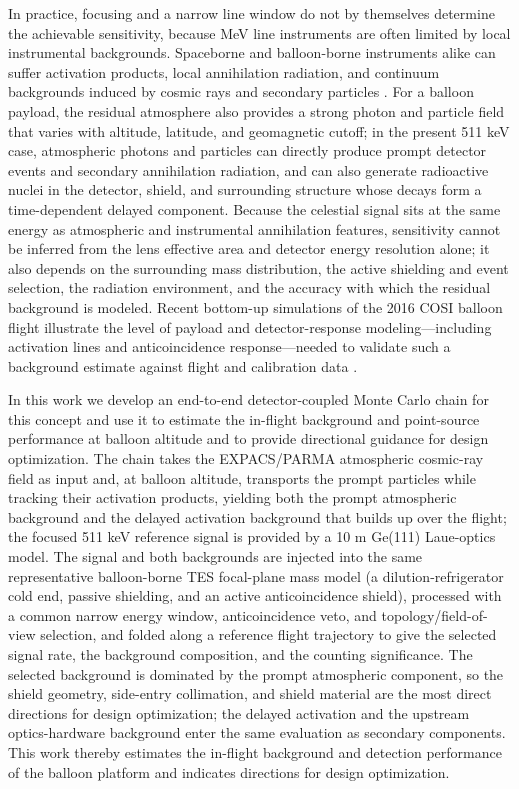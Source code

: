 \documentclass[pdflatex,sn-mathphys-num]{sn-jnl}
\begin{document}
In practice, focusing and a narrow line window do not by themselves determine the achievable sensitivity, because MeV line instruments are often limited by local instrumental backgrounds. Spaceborne and balloon-borne instruments alike can suffer activation products, local annihilation radiation, and continuum backgrounds induced by cosmic rays and secondary particles \cite{Sturner2003,Gehrels1985}. For a balloon payload, the residual atmosphere also provides a strong photon and particle field that varies with altitude, latitude, and geomagnetic cutoff; in the present 511 keV case, atmospheric photons and particles can directly produce prompt detector events and secondary annihilation radiation, and can also generate radioactive nuclei in the detector, shield, and surrounding structure whose decays form a time-dependent delayed component. Because the celestial signal sits at the same energy as atmospheric and instrumental annihilation features, sensitivity cannot be inferred from the lens effective area and detector energy resolution alone; it also depends on the surrounding mass distribution, the active shielding and event selection, the radiation environment, and the accuracy with which the residual background is modeled. Recent bottom-up simulations of the 2016 COSI balloon flight illustrate the level of payload and detector-response modeling---including activation lines and anticoincidence response---needed to validate such a background estimate against flight and calibration data \cite{Gallego2025Balloon,Beechert2022,Ciabattoni2025ACS}.

In this work we develop an end-to-end detector-coupled Monte Carlo chain for this concept and use it to estimate the in-flight background and point-source performance at balloon altitude and to provide directional guidance for design optimization. The chain takes the EXPACS/PARMA atmospheric cosmic-ray field as input and, at balloon altitude, transports the prompt particles while tracking their activation products, yielding both the prompt atmospheric background and the delayed activation background that builds up over the flight; the focused 511 keV reference signal is provided by a 10 m Ge(111) Laue-optics model. The signal and both backgrounds are injected into the same representative balloon-borne TES focal-plane mass model (a dilution-refrigerator cold end, passive shielding, and an active anticoincidence shield), processed with a common narrow energy window, anticoincidence veto, and topology/field-of-view selection, and folded along a reference flight trajectory to give the selected signal rate, the background composition, and the counting significance. The selected background is dominated by the prompt atmospheric component, so the shield geometry, side-entry collimation, and shield material are the most direct directions for design optimization; the delayed activation and the upstream optics-hardware background enter the same evaluation as secondary components. This work thereby estimates the in-flight background and detection performance of the balloon platform and indicates directions for design optimization.
\end{document}
